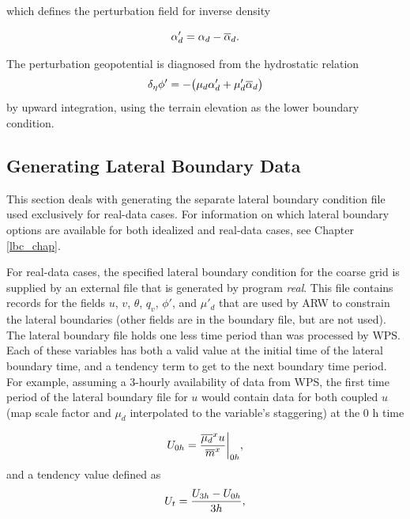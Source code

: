 \noindent which defines the perturbation field for inverse density

\begin{equation}
\alpha'_d = \alpha_d - \overline{\alpha}_d.
\notag
\end{equation}

\noindent 
The perturbation geopotential 
is diagnosed from the hydrostatic relation
\begin{equation}
\delta_{\eta} \phi'  = - \big ( {\mu}_d \alpha'_d + \mu'_d
\overline{\alpha}_d \big )
\notag
\end{equation}
%
by upward integration, using the terrain elevation as the lower boundary condition.

\subsection{Generating Lateral Boundary Data}

This section deals with generating the separate lateral boundary condition file used
exclusively for real-data cases.  For information
on which lateral boundary options are available for both idealized and real-data
cases, see Chapter \eqref{lbc_chap}.

For real-data cases, the specified 
lateral boundary condition for the coarse grid is supplied by an external file that is
generated by program {\it real}.
This file contains 
records for the fields $u$, $v$, $\theta$, $q_v$, $\phi'$, and $\mu'_d$ that are used by ARW to
constrain the lateral boundaries (other fields are in the boundary file, but are not used).   
The lateral boundary file holds one less time period than was processed by WPS.
Each of these variables has both
a valid value at the initial time of the lateral boundary time, and a tendency term to get to the 
next boundary time period.  For example, assuming a 3-hourly availability of data from WPS,
the first time period of the lateral boundary file
for $u$ would contain data for both coupled $u$ (map scale factor and $\mu_d$ interpolated to 
the variable's 
staggering) at the 0 h time

\begin{equation}
U_{0h} = {{\overline{\mu_d}^x u}\over{\overline{m}^x}} \bigg | _{0h},
\notag
\end{equation}
\noindent and a tendency value defined as
\begin{equation}
U_t = { U_{3h} - U_{0h} \over 3h},
\notag
\end{equation}

